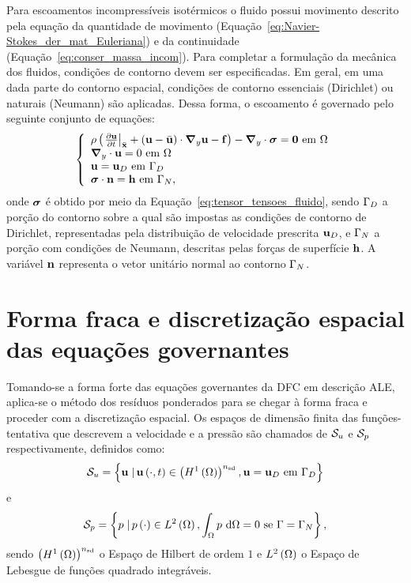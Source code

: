 Para escoamentos incompressíveis isotérmicos o fluido possui movimento descrito pela equação da quantidade de movimento (Equação~\eqref{eq:Navier-Stokes_der_mat_Euleriana}) e da continuidade (Equação~\eqref{eq:conser_massa_incom}). Para completar a formulação da mecânica dos fluidos, condições de contorno devem ser especificadas. Em geral, em uma dada parte do contorno espacial, condições de contorno essenciais (Dirichlet) ou naturais (Neumann) são aplicadas. Dessa forma, o escoamento é governado pelo seguinte conjunto de equações:
\begin{equation}
	\left\{
	\begin{array}{l}
		\density\left( \left. \frac{\partial\velocity}{\partial t} \right|_{\posALE}  + \left(\velocity - \velocityALE \right)\cdot\gradient\velocity - \sbodyforce \right) - \divergence \cdot \stressTensor = \vzero  \ \textrm{em} \ \domain\\
		\divergence \cdot \velocity = 0  \ \textrm{em} \ \domain\\
		\velocity = \velocityD \ \textrm{em} \ \boundaryD \\
		\stressTensor \cdot \snormal = \surfaceLoad \ \textrm{em} \ \boundaryN,
	\end{array} \label{eq:conj_eq_DFC_ALE}
	\right.
\end{equation}
\noindent onde $\boldsymbol{\sigma}$ é obtido por meio da Equação~\eqref{eq:tensor_tensoes_fluido}, sendo $\Gamma_{D}$ a porção do contorno sobre a qual são impostas as condições de contorno de Dirichlet, representadas pela distribuição de velocidade prescrita $\mathbf{u}_D$, e $\Gamma_{N}$ a porção com condições de Neumann, descritas pelas forças de superfície $\mathbf{h}$. A variável $\mathbf{n}$ representa o vetor unitário normal ao contorno $\Gamma_{N}$.

\section{Forma fraca e discretização espacial das equações governantes} \label{capitulo:Cap2:FormaFraca}

Tomando-se a forma forte das equações governantes da DFC em descrição ALE, aplica-se o método dos resíduos ponderados para se chegar à forma fraca e proceder com a discretização espacial. Os espaços de dimensão finita das funções-tentativa que descrevem a velocidade e a pressão são chamados de $\mathcal{S}_u$ e $\mathcal{S}_p$ respectivamente, definidos como:
\begin{align}
\mathcal{S}_u = \left\{\mathbf{u} \left . \right| \mathbf{u} \left(\cdot,t\right) \in \left(H^{1}\left(\Omega\right)\right)^{{n_{\mathrm{sd}}}}, \mathbf{u} = \mathbf{u}_D \ \textrm {em} \ \Gamma_{D} \right\}
\end{align}
\noindent e
\begin{align}
\mathcal{S}_p = \left\{p \left . \right| p \left(\cdot\right) \in L^{2}\left(\Omega\right), \int_{\Omega}p \textrm { } \mathrm{d} \Omega = 0 \textrm { se } \Gamma = \Gamma_{N} \right\},
\end{align}
\noindent sendo $\left(H^{1}\left(\Omega\right)\right)^{{n_{\mathrm{sd}}}}$ o Espaço de Hilbert de ordem $1$ e $L^{2}\left(\Omega\right)$ o Espaço de Lebesgue de funções quadrado integráveis.

